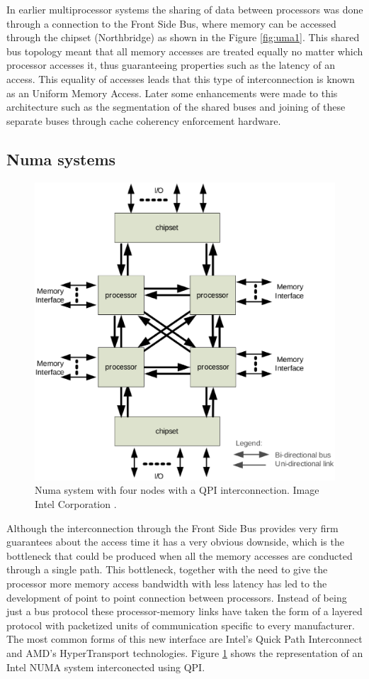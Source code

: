 In earlier multiprocessor systems the sharing of data between processors was done through a connection to the Front Side Bus, where memory can be accessed through the chipset (Northbridge) as shown in the Figure \ref{fig:uma1}. This shared bus topology meant that all memory accesses are treated equally no matter which processor accesses it, thus guaranteeing properties such as the latency of an access. This equality of accesses leads that this type of interconnection is known as an Uniform Memory Access. Later some enhancements were made to this architecture such as the segmentation of the shared buses and joining of these separate buses through cache coherency enforcement hardware.

\subsection{Numa systems}\label{subsection:numa}

\begin{figure}
	\centering
		\includegraphics[width=.6\textwidth]{figures/numa-qpi.eps}
		\caption[basic-uma]{Numa system with four nodes with a QPI interconnection. Image Intel Corporation \cite{qpi-intel}. }
		\label{fig:numa1}
\end{figure}

Although the interconnection through the Front Side Bus provides very firm guarantees about the access time it has a very obvious downside, which is the bottleneck that could be produced when all the memory accesses are conducted through a single path. This bottleneck, together with the need to give the processor more memory access bandwidth with less latency has led to the development of point to point connection between processors. Instead of being just a bus protocol these processor-memory links have taken the form of a layered protocol with packetized units of communication specific to every manufacturer. The most common forms of this new interface are Intel's Quick Path Interconnect and AMD's HyperTransport technologies. Figure \ref{fig:numa1} shows the representation of an Intel NUMA system interconected using QPI.

